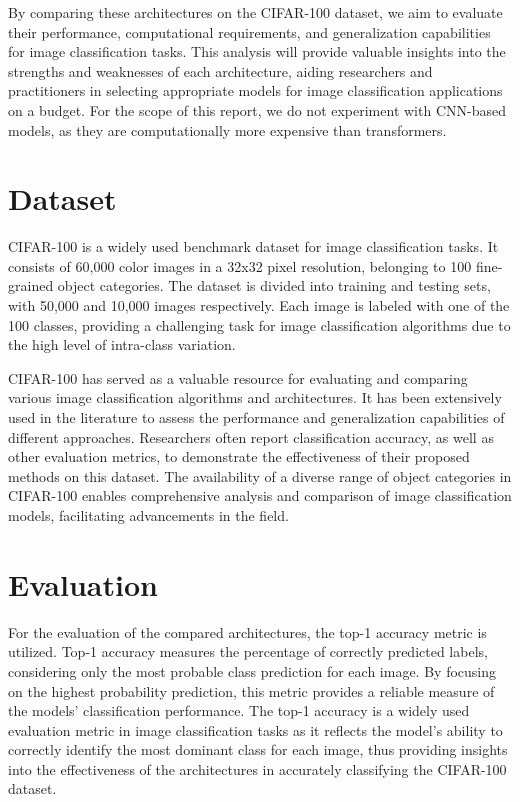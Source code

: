 \documentclass{article}
\begin{document}
By comparing these architectures on the CIFAR-100 dataset, we aim to evaluate their performance, computational requirements, and generalization capabilities for image classification tasks.
This analysis will provide valuable insights into the strengths and weaknesses of each architecture, aiding researchers and practitioners in selecting appropriate models for image classification applications on a budget.
For the scope of this report, we do not experiment with CNN-based models, as they are computationally more expensive than transformers.

\section{Dataset}
CIFAR-100 \cite{Krizhevsky09learningmultiple} is a widely used benchmark dataset for image classification tasks.
It consists of 60,000 color images in a 32x32 pixel resolution, belonging to 100 fine-grained object categories.
The dataset is divided into training and testing sets, with 50,000 and 10,000 images respectively.
Each image is labeled with one of the 100 classes, providing a challenging task for image classification algorithms due to the high level of intra-class variation.

CIFAR-100 has served as a valuable resource for evaluating and comparing various image classification algorithms and architectures.
It has been extensively used in the literature to assess the performance and generalization capabilities of different approaches.
Researchers often report classification accuracy, as well as other evaluation metrics, to demonstrate the effectiveness of their proposed methods on this dataset.
The availability of a diverse range of object categories in CIFAR-100 enables comprehensive analysis and comparison of image classification models, facilitating advancements in the field.


\section{Evaluation}
For the evaluation of the compared architectures, the top-1 accuracy metric is utilized.
Top-1 accuracy measures the percentage of correctly predicted labels, considering only the most probable class prediction for each image. By focusing on the highest probability prediction, this metric provides a reliable measure of the models' classification performance.
The top-1 accuracy is a widely used evaluation metric in image classification tasks as it reflects the model's ability to correctly identify the most dominant class for each image, thus providing insights into the effectiveness of the architectures in accurately classifying the CIFAR-100 dataset.
\end{document}
